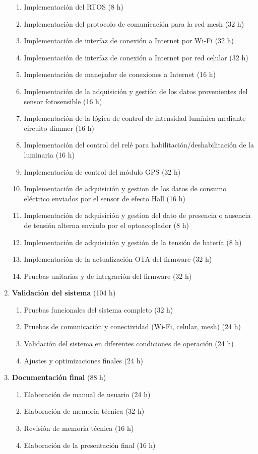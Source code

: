 \documentclass[
11pt, %
]{charter}
\begin{document}
\begin{enumerate}
	\begin{enumerate}
	\item Implementación del RTOS (8 h)
	\item Implementación del protocolo de comunicación para la red mesh (32 h)
	\item Implementación de interfaz de conexión a Internet por Wi-Fi (32 h)
	\item Implementación de interfaz de conexión a Internet por red celular (32 h)
	\item Implementación de manejador de conexiones a Internet (16 h)
	\item Implementación de la adquisición y gestión de los datos provenientes del sensor fotosensible (16 h)
	\item Implementación de la lógica de control de intensidad lumínica mediante circuito dimmer (16 h)
	\item Implementación del control del relé para habilitación/deshabilitación de la luminaria (16 h)
	\item Implementación de control del módulo GPS (32 h)
	\item Implementación de adquisición y gestion de los datos de consumo eléctrico enviados por el sensor de efecto Hall (16 h)
	\item Implementación de adquisición y gestion del dato de presencia o ausencia de tensión alterna enviado por el optoacoplador (8 h)
	\item Implementación de adquisición y gestión de la tensión de batería (8 h)
	\item Implementación de la actualización OTA del firmware (32 h)
	\item Pruebas unitarias y de integración del firmware (32 h)
	\end{enumerate}
\item \textbf{Validación del sistema} (104 h)
	\begin{enumerate}
	\item Pruebas funcionales del sistema completo (32 h)
	\item Pruebas de comunicación y conectividad (Wi-Fi, celular, mesh) (24 h)
	\item Validación del sistema en diferentes condiciones de operación (24 h)
	\item Ajustes y optimizaciones finales (24 h)
	\end{enumerate}
\item \textbf{Documentación final} (88 h)
	\begin{enumerate}
	\item Elaboración de manual de usuario (24 h)
	\item Elaboración de memoria técnica (32 h)
	\item Revisión de memoria técnica (16 h)
	\item Elaboración de la presentación final (16 h)
	\end{enumerate}
\end{enumerate}
\end{document}
